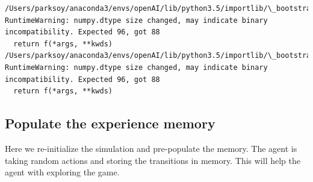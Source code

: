 \documentclass[11pt]{article}
\begin{document}
    \begin{Verbatim}[commandchars=\\\{\}]
/Users/parksoy/anaconda3/envs/openAI/lib/python3.5/importlib/\_bootstrap.py:222: RuntimeWarning: numpy.dtype size changed, may indicate binary incompatibility. Expected 96, got 88
  return f(*args, **kwds)
/Users/parksoy/anaconda3/envs/openAI/lib/python3.5/importlib/\_bootstrap.py:222: RuntimeWarning: numpy.dtype size changed, may indicate binary incompatibility. Expected 96, got 88
  return f(*args, **kwds)

    \end{Verbatim}

    \subsection{Populate the experience
memory}\label{populate-the-experience-memory}

Here we re-initialize the simulation and pre-populate the memory. The
agent is taking random actions and storing the transitions in memory.
This will help the agent with exploring the game.
\end{document}
